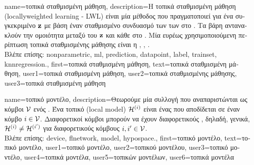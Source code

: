 {name={\foreignlanguage{greek}{τοπικά σταθμισμένη μάθηση}},
	description={\foreignlanguage{greek}{Η τοπικά σταθμισμένη μάθηση} 
		(locally\linebreak weighted learning - LWL) \foreignlanguage{greek}{είναι μία}  \foreignlanguage{greek}{μέθοδος} 
		 \foreignlanguage{greek}{που πραγματοποιεί}  \foreignlanguage{greek}{για ένα συγκεκριμένο} 
		 ${\bf z}$ \foreignlanguage{greek}{με βάση έναν σταθμισμένο συνδυασμό των}  
		\foreignlanguage{greek}{των}  \foreignlanguage{greek}{στο} . 
		\foreignlanguage{greek}{Τα βάρη αντανακλούν την ομοιότητα μεταξύ του}  ${\bf z}$ \foreignlanguage{greek}{και 
		κάθε}  \foreignlanguage{greek}{στο} . \foreignlanguage{greek}{Μία ευρέως χρησιμοποιούμενη 
		περίπτωση τοπικά σταθμισμένης μάθησης είναι η}  \cite{MLBasics}, \cite{BishopBook}, \cite{LocallyWeightedLearning}.
				\\
		\foreignlanguage{greek}{Βλέπε επίσης:} \gls{nonparametric}, \gls{ml}, \gls{prediction}, \gls{datapoint}, \gls{label}, \gls{trainset}, \gls{knnregression}.}, 
	first={\foreignlanguage{greek}{τοπικά σταθμισμένη μάθηση}},
	text={\foreignlanguage{greek}{τοπικά σταθμισμένη μάθηση}},
	user1={\foreignlanguage{greek}{τοπικά σταθμισμένη μάθηση}}, %
	user2={\foreignlanguage{greek}{τοπικά σταθμισμένης μάθησης}}, %
	user3={\foreignlanguage{greek}{τοπικά σταθμισμένη μάθηση}} %
}

{name={\foreignlanguage{greek}{τοπικό μοντέλο}},
	description={\foreignlanguage{greek}{Θεωρούμε μία συλλογή}  
		\foreignlanguage{greek}{που αναπαριστώνται ως κόμβοι $\mathcal{V}$ ενός} . \foreignlanguage{greek}{Ένα τοπικό} 
		 (local model) $\mathcal{H}^{(i)}$ \foreignlanguage{greek}{είναι ένας}  
		\foreignlanguage{greek}{που αποδίδεται σε έναν κόμβο $i \in \mathcal{V}$. 
		Διαφορετικοί κόμβοι μπορούν να έχουν διαφορετικούς} , \foreignlanguage{greek}{δηλαδή, γενικά, 
		$\mathcal{H}^{(i)} \neq \mathcal{H}^{(i')}$ για διαφορετικούς κόμβους} $i, i' \in \mathcal{V}$.
		\\
		\foreignlanguage{greek}{Βλέπε επίσης:} \gls{device}, \gls{flnetwork}, \gls{model}, \gls{hypospace}.},
		first={\foreignlanguage{greek}{τοπικό μοντέλο}},
		text={\foreignlanguage{greek}{τοπικό μοντέλο}},
		user1={\foreignlanguage{greek}{τοπικό μοντέλο}}, %
		user2={\foreignlanguage{greek}{τοπικού μοντέλου}}, %
		user3={\foreignlanguage{greek}{τοπικό μοντέλο}}, %
		user4={\foreignlanguage{greek}{τοπικά μοντέλα}}, %
		user5={\foreignlanguage{greek}{τοπικών μοντέλων}}, %
		user6={\foreignlanguage{greek}{τοπικά μοντέλα}} %
}

